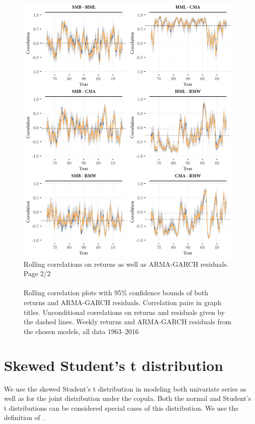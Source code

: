 \begin{figure}[H]
  \centering
  \footnotesize
  \caption{Rolling correlations on returns as well as ARMA-GARCH residuals. Page 2/2 \\ \quad \\
  Rolling correlation plots with 95\% confidence bounds of both returns and ARMA-GARCH residuals. Correlation pairs in graph titles. Unconditional correlations on returns and residuals given by the dashed lines. Weekly returns and ARMA-GARCH residuals from the chosen models, all data 1963--2016}
  \label{fig:appendix_rolling2}
  \includegraphics[scale=1]{graphics/appendix_rolling2.png}  
\end{figure}

\newpage

\section{Skewed Student's t distribution} 
\label{app:ghstmv}
We use the skewed Student's t distribution in modeling both univariate series as well as for the joint distribution under the copula. Both the normal and Student's t distributions can be considered special cases of this distribution. We use the definition of~\textcite{Hansen1994}.

